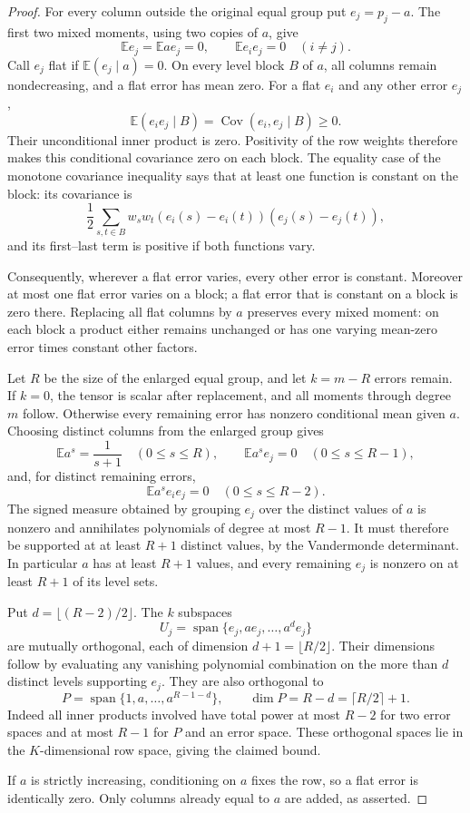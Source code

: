 \documentclass[11pt]{article}
\newcommand{\E}{\mathbb E}
\begin{document}
\begin{proof}
For every column outside the original equal group put $e_j=p_j-a$.
The first two mixed moments, using two copies of $a$, give
\[
 \E e_j=\E ae_j=0,\qquad \E e_i e_j=0\quad(i\ne j).
\]
Call $e_j$ flat if $\E(e_j\mid a)=0$. On every level block $B$ of
$a$, all columns remain nondecreasing, and a flat error has mean zero.
For a flat $e_i$ and any other error $e_j$,
\[
 \E(e_i e_j\mid B)=\operatorname{Cov}(e_i,e_j\mid B)\ge0.
\]
Their unconditional inner product is zero. Positivity of the row
weights therefore makes this conditional covariance zero on each block.
The equality case of the monotone covariance inequality says that
at least one function is constant on the block: its covariance is
\[
 \frac12\sum_{s,t\in B}w_sw_t
 (e_i(s)-e_i(t))(e_j(s)-e_j(t)),
\]
and its first--last term is positive if both functions vary.

Consequently, wherever a flat error varies, every other error is
constant. Moreover at most one flat error varies on a block; a flat
error that is constant on a block is zero there. Replacing all flat
columns by $a$ preserves every mixed moment: on each block a product
either remains unchanged or has one varying mean-zero error times
constant other factors.

Let $R$ be the size of the enlarged equal group, and let
$k=m-R$ errors remain. If $k=0$, the tensor is scalar after replacement,
and all moments through degree $m$ follow. Otherwise every remaining
error has nonzero conditional mean given $a$.
Choosing distinct columns from the enlarged group gives
\[
 \E a^s=\frac1{s+1}\quad(0\le s\le R),\qquad
 \E a^s e_j=0\quad(0\le s\le R-1),
\]
and, for distinct remaining errors,
\[
 \E a^s e_i e_j=0\quad(0\le s\le R-2).
\]
The signed measure obtained by grouping $e_j$ over the distinct values
of $a$ is nonzero and annihilates polynomials of degree at most $R-1$.
It must therefore be supported at at least $R+1$ distinct values,
by the Vandermonde determinant. In particular $a$ has at least $R+1$
values, and every remaining $e_j$ is nonzero on at least $R+1$ of
its level sets.

Put $d=\lfloor(R-2)/2\rfloor$. The $k$ subspaces
\[
 U_j=\operatorname{span}\{e_j,ae_j,\ldots,a^d e_j\}
\]
are mutually orthogonal, each of dimension $d+1=\lfloor R/2\rfloor$.
Their dimensions follow by evaluating any vanishing polynomial
combination on the more than $d$ distinct levels supporting $e_j$.
They are also orthogonal to
\[
 P=\operatorname{span}\{1,a,\ldots,a^{R-1-d}\},
 \qquad \dim P=R-d=\lceil R/2\rceil+1.
\]
Indeed all inner products involved have total power at most $R-2$
for two error spaces and at most $R-1$ for $P$ and an error space.
These orthogonal spaces lie in the $K$-dimensional row space, giving
the claimed bound.

If $a$ is strictly increasing, conditioning on $a$ fixes the row,
so a flat error is identically zero. Only columns already equal to
$a$ are added, as asserted.
\end{proof}
\end{document}
